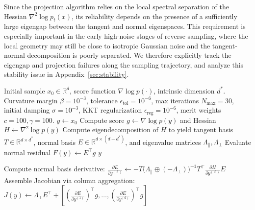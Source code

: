 \documentclass[11pt]{article}
\begin{document}
Since the projection algorithm relies on the local spectral separation of the Hessian $\nabla^2 \log p_t(x)$, its reliability depends on the presence of a sufficiently large eigengap between the tangent and normal eigenspaces. This requirement is especially important in the early high-noise stages of reverse sampling, where the local geometry may still be close to isotropic Gaussian noise and the tangent-normal decomposition is poorly separated. We therefore explicitly track the eigengap and projection failures along the sampling trajectory, and analyze this stability issue in Appendix~\ref{sec:stability}.

\newpage
\begin{algorithm}[tb]
\caption{Projection onto Log-density Ridge Sets via Regularized LM}
\label{alg:ridge_projection}
\begin{algorithmic}[1]
 Initial sample $x_0 \in \mathbb{R}^d$, score function $\nabla \log p(\cdot)$, intrinsic dimension $d^*$.
 Curvature margin $\beta=10^{-3}$, tolerance $\epsilon_{\text{tol}}=10^{-6}$, max iterations $N_{\max}=30$, initial damping $\sigma=10^{-3}$, KKT regularization $\epsilon_{\text{reg}}=10^{-6}$, merit weights $c=100, \gamma=100$.
 $y \leftarrow x_0$
    \State Compute score $g \leftarrow \nabla \log p(y)$ and Hessian $H \leftarrow \nabla^2 \log p(y)$
    \State Compute eigendecomposition of $H$ to yield tangent basis $T \in \mathbb{R}^{d \times d^*}$, normal basis $E \in \mathbb{R}^{d \times (d-d^*)}$, and eigenvalue matrices $\Lambda_{\parallel}, \Lambda_{\perp}$
    \State Evaluate normal residual $F(y) \leftarrow E^\intercal g$
        \State \Return $y$ 
    \EndIf
    
    \State {}
        \State Compute normal basis derivative: $\frac{\partial E}{\partial y^{(\ell)}} \leftarrow - T \big(\Lambda_{\parallel} \oplus (-\Lambda_{\perp})\big)^{-1} T^\intercal \frac{\partial H}{\partial y^{(\ell)}} E$
    \EndFor
    \State Assemble Jacobian via column aggregation: $J(y) \leftarrow \Lambda_{\perp} E^\intercal + \left[ \left(\frac{\partial E}{\partial y^{(1)}}\right)^\intercal g, \dots, \left(\frac{\partial E}{\partial y^{(d)}}\right)^\intercal g \right]$
    

\end{algorithmic}
\end{algorithm}
\end{document}
